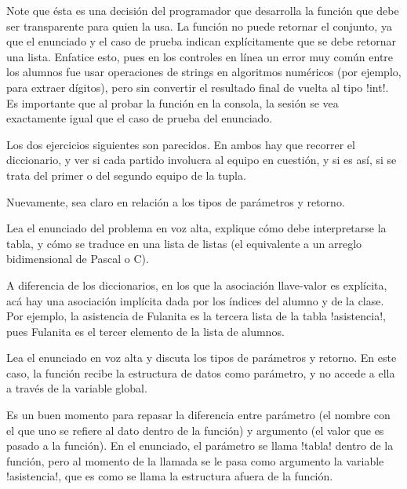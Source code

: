 \documentclass[10pt]{article}
\begin{document}
  Note que ésta es una decisión del programador que desarrolla la función
  que debe ser transparente para quien la usa.
  La función no puede retornar el conjunto,
  ya que el enunciado y el caso de prueba
  indican explícitamente que se debe retornar una lista.
  Enfatice esto, pues en los controles en línea un error muy común entre los alumnos
  fue usar operaciones de strings en algoritmos numéricos
  (por ejemplo, para extraer dígitos),
  pero sin convertir el resultado final de vuelta al tipo \li!int!.
  Es importante que al probar la función en la consola,
  la sesión se vea exactamente igual que el caso de prueba del enunciado.


  Los dos ejercicios siguientes son parecidos.
  En ambos hay que recorrer el diccionario,
  y ver si cada partido involucra al equipo en cuestión,
  y si es así, si se trata del primer o del segundo equipo de la tupla.

  Nuevamente,
  sea claro en relación a los tipos de parámetros y retorno.


  Lea el enunciado del problema en voz alta,
  explique cómo debe interpretarse la tabla,
  y cómo se traduce en una lista de listas
  (el equivalente a un arreglo bidimensional de Pascal o C).

  A diferencia de los diccionarios,
  en los que la asociación llave-valor es explícita,
  acá hay una asociación implícita dada por los índices del alumno y de la clase.
  Por ejemplo,
  la asistencia de Fulanita es la tercera lista de la tabla \li!asistencia!,
  pues Fulanita es el tercer elemento de la lista de alumnos.


  Lea el enunciado en voz alta y discuta los tipos de parámetros y retorno.
  En este caso,
  la función recibe la estructura de datos como parámetro,
  y no accede a ella a través de la variable global.

  Es un buen momento para repasar la diferencia entre parámetro
  (el nombre con el que uno se refiere al dato dentro de la función)
  y argumento
  (el valor que es pasado a la función).
  En el enunciado, el parámetro se llama \li!tabla! dentro de la función,
  pero al momento de la llamada se le pasa como argumento la variable \li!asistencia!,
  que es como se llama la estructura afuera de la función.
\end{document}
